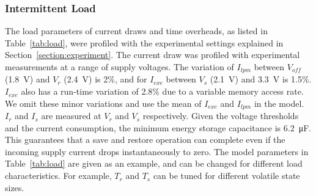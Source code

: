 
\subsubsection{Intermittent Load} \label{ssubsec:loadconfig}

The load parameters of current draws and time overheads, as listed in Table~\ref{tab:load}, were profiled with the experimental settings explained in Section~\ref{section:experiment}. 
The current draw was profiled with experimental measurements at a range of supply voltages. The variation of $I_{lpm}$ between $V_{off}$ (\SI{1.8}{\volt}) and $V_{r}$ (\SI{2.4}{\volt}) is 2\%, and for $I_{exe}$ between $V_{s}$ (\SI{2.1}{\volt}) and \SI{3.3}{\volt} is 1.5\%. $I_{exe}$ also has a run-time variation of 2.8\% due to a variable memory access rate. We omit these minor variations and use the mean of $I_{exe}$ and $I_{lpm}$ in the model. $I_{r}$ and $I_{s}$ are measured at $V_{r}$ and $V_{s}$ respectively. Given the voltage thresholds and the current consumption, the minimum energy storage capacitance is \SI{6.2}{\micro\farad}. This guarantees that a save and restore operation can complete even if the incoming supply current drops instantaneously to zero. The model parameters in Table~\ref{tab:load} are given as an example, and can be changed for different load characteristics. For example, $T_{r}$ and $T_{s}$ can be tuned for different volatile state sizes.

